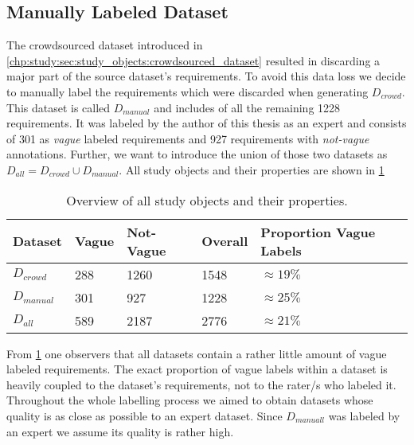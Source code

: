 \subsection{Manually Labeled Dataset}
\label{chp:study:sec:study_objects:dataset_creation:manual_labeling}
The crowdsourced dataset introduced in \cref{chp:study:sec:study_objects:crowdsourced_dataset} resulted in discarding a major part of the source dataset's requirements.
To avoid this data loss we decide to manually label the requirements which were discarded when generating $D_{crowd}$.
This dataset is called $D_{manual}$ and includes of all the remaining 1228 requirements.
It was labeled by the author of this thesis as an expert and consists of 301 as \textit{vague} labeled requirements and 927 requirements with \textit{not-vague} annotations.
Further, we want to introduce the union of those two datasets as $D_{all} = D_{crowd} \cup D_{manual}$.
All study objects and their properties are shown in \cref{tab:study:objects:all_datasets}
\newpage
\begin{table}[htpb]
    \centering
    \begin{tabular}{l | l l l l}
        \toprule
        Dataset & Vague & Not-Vague & Overall & Proportion Vague Labels \\
        \midrule
        $D_{crowd}$ & 288 & 1260 & 1548 & $\approx19\%$\\
        $D_{manual}$ & 301 & 927 & 1228 & $\approx25\%$\\
        \midrule
        $D_{all}$ & 589 & 2187 & 2776 &  $\approx21\%$\\
        \bottomrule
    \end{tabular}
    \caption[Overview of all study objects]{Overview of all study objects and their properties.}\label{tab:study:objects:all_datasets}
\end{table}

From \cref{tab:study:objects:all_datasets} one observers that all datasets contain a rather little amount of vague labeled requirements.
The exact proportion of vague labels within a dataset is heavily coupled to the dataset's requirements, not to the rater/s who labeled it.
Throughout the whole labelling process we aimed to obtain datasets whose quality is as close as possible to an expert dataset.
Since $D_{manuall}$ was labeled by an expert we assume its quality is rather high.
